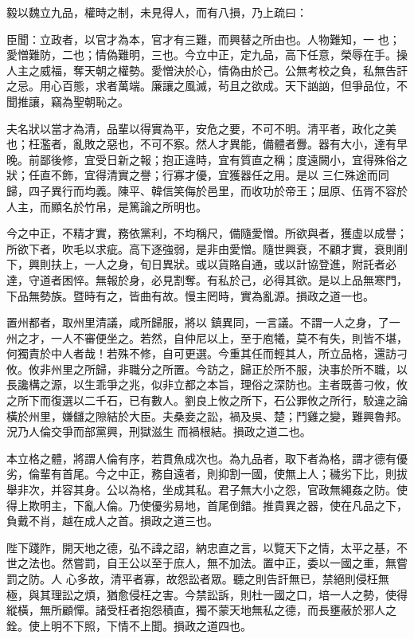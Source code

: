 \begin{pinyinscope}
 毅以魏立九品，權時之制，未見得人，而有八損，乃上疏曰：



 臣聞：立政者，以官才為本，官才有三難，而興替之所由也。人物難知，一
 也；愛憎難防，二也；情偽難明，三也。今立中正，定九品，高下任意，榮辱在手。操人主之威福，奪天朝之權勢。愛憎決於心，情偽由於己。公無考校之負，私無告訐之忌。用心百態，求者萬端。廉讓之風滅，茍且之欲成。天下訩訩，但爭品位，不聞推讓，竊為聖朝恥之。



 夫名狀以當才為清，品輩以得實為平，安危之要，不可不明。清平者，政化之美也；枉濫者，亂敗之惡也，不可不察。然人才異能，備體者釁。器有大小，達有早晚。前鄙後修，宜受日新之報；抱正違時，宜有質直之稱；度遠闕小，宜得殊俗之狀；任直不飾，宜得清實之譽；行寡才優，宜獲器任之用。是以
 三仁殊途而同歸，四子異行而均義。陳平、韓信笑侮於邑里，而收功於帝王；屈原、伍胥不容於人主，而顯名於竹帛，是篤論之所明也。



 今之中正，不精才實，務依黨利，不均稱尺，備隨愛憎。所欲與者，獲虛以成譽；所欲下者，吹毛以求疵。高下逐強弱，是非由愛憎。隨世興衰，不顧才實，衰則削下，興則扶上，一人之身，旬日異狀。或以貨賂自通，或以計協登進，附託者必達，守道者困悴。無報於身，必見割奪。有私於己，必得其欲。是以上品無寒門，下品無勢族。暨時有之，皆曲有故。慢主罔時，實為亂源。損政之道一也。



 置州都者，取州里清議，咸所歸服，將以
 鎮異同，一言議。不謂一人之身，了一州之才，一人不審便坐之。若然，自仲尼以上，至于庖犧，莫不有失，則皆不堪，何獨責於中人者哉！若殊不修，自可更選。今重其任而輕其人，所立品格，還訪刁攸。攸非州里之所歸，非職分之所置。今訪之，歸正於所不服，決事於所不職，以長讒構之源，以生乖爭之兆，似非立都之本旨，理俗之深防也。主者既善刁攸，攸之所下而復選以二千石，已有數人。劉良上攸之所下，石公罪攸之所行，駮違之論橫於州里，嫌讎之隙結於大臣。夫桑妾之訟，禍及吳、楚；鬥雞之變，難興魯邦。況乃人倫交爭而部黨興，刑獄滋生
 而禍根結。損政之道二也。



 本立格之體，將謂人倫有序，若貫魚成次也。為九品者，取下者為格，謂才德有優劣，倫輩有首尾。今之中正，務自遠者，則抑割一國，使無上人；穢劣下比，則拔舉非次，并容其身。公以為格，坐成其私。君子無大小之怨，官政無繩姦之防。使得上欺明主，下亂人倫。乃使優劣易地，首尾倒錯。推貴異之器，使在凡品之下，負戴不肖，越在成人之首。損政之道三也。



 陛下踐阼，開天地之德，弘不諱之詔，納忠直之言，以覽天下之情，太平之基，不世之法也。然嘗罰，自王公以至于庶人，無不加法。置中正，委以一國之重，無嘗罰之防。人
 心多故，清平者寡，故怨訟者眾。聽之則告訐無已，禁絕則侵枉無極，與其理訟之煩，猶愈侵枉之害。今禁訟訴，則杜一國之口，培一人之勢，使得縱橫，無所顧憚。諸受枉者抱怨積直，獨不蒙天地無私之德，而長壅蔽於邪人之銓。使上明不下照，下情不上聞。損政之道四也。




\end{pinyinscope}
